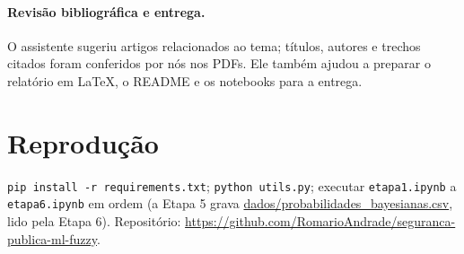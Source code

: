 \documentclass[article,12pt,oneside,a4paper,brazil,sumario=tradicional]{abntex2}
\begin{document}
\begin{apendicesenv}
\paragraph{Revisão bibliográfica e entrega.} O assistente sugeriu artigos relacionados ao
tema; títulos, autores e trechos citados foram conferidos por nós nos PDFs. Ele também
ajudou a preparar o relatório em \LaTeX, o README e os notebooks para a entrega.

\section{Reprodução}

\texttt{pip install -r requirements.txt}; \texttt{python utils.py}; executar
\texttt{etapa1.ipynb} a \texttt{etapa6.ipynb} em ordem (a Etapa 5 grava
\url{dados/probabilidades_bayesianas.csv}, lido pela Etapa 6). Repositório:
\url{https://github.com/RomarioAndrade/seguranca-publica-ml-fuzzy}.

\end{apendicesenv}
\end{document}
